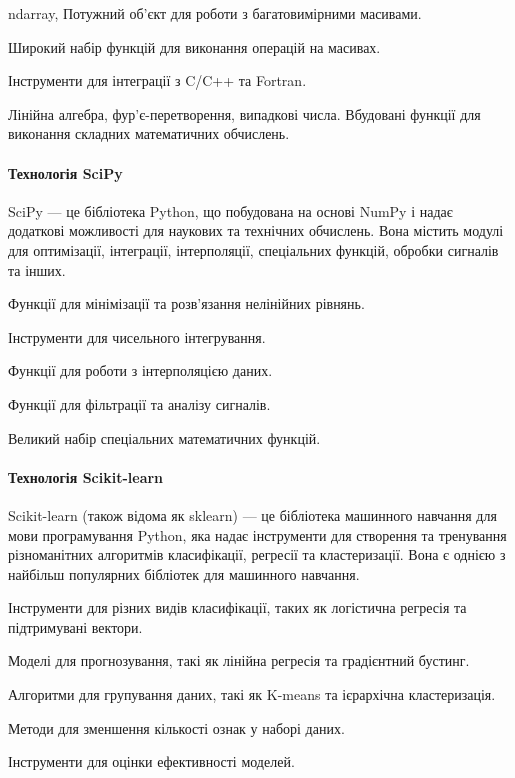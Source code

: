 \documentclass[oneside,14pt]{extarticle}
\begin{document}
\begin{list}{-}{Основні можливості NumPy:}
	\item ndarray, Потужний об'єкт для роботи з багатовимірними масивами.
	\item Широкий набір функцій для виконання операцій на масивах.
	\item Інструменти для інтеграції з C/C++ та Fortran.
	\item Лінійна алгебра, фур'є-перетворення, випадкові числа. Вбудовані функції для виконання складних математичних обчислень.
\end{list}

\paragraph{Технологія SciPy}

SciPy — це бібліотека Python, що побудована на основі NumPy і надає додаткові можливості для наукових та технічних обчислень. Вона містить модулі для оптимізації, інтеграції, інтерполяції, спеціальних функцій, обробки сигналів та інших.

\begin{list}{-}{Основні можливості SciPy:}
	\item Функції для мінімізації та розв'язання нелінійних рівнянь.
	\item Інструменти для чисельного інтегрування.
	\item Функції для роботи з інтерполяцією даних.
	\item Функції для фільтрації та аналізу сигналів.
	\item Великий набір спеціальних математичних функцій.
\end{list}

\paragraph{Технологія Scikit-learn}

Scikit-learn (також відома як sklearn) — це бібліотека машинного навчання для мови програмування Python, яка надає інструменти для створення та тренування різноманітних алгоритмів класифікації, регресії та кластеризації. Вона є однією з найбільш популярних бібліотек для машинного навчання.

\begin{list}{-}{Основні можливості Scikit-learn:}
	\item Інструменти для різних видів класифікації, таких як логістична регресія та підтримувані вектори.
	\item Моделі для прогнозування, такі як лінійна регресія та градієнтний бустинг.
	\item Алгоритми для групування даних, такі як K-means та ієрархічна кластеризація.
	\item Методи для зменшення кількості ознак у наборі даних.
	\item Інструменти для оцінки ефективності моделей.
\end{list}
\end{document}
